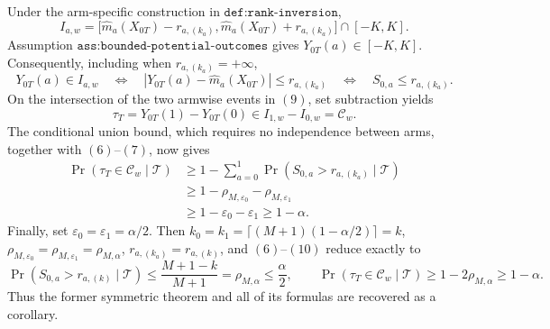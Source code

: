 Under the arm-specific construction in \(\texttt{def:rank-inversion}\),
\[
I_{a,w}=\bigl[\widehat m_a(X_{0T})-r_{a,(k_a)},\widehat m_a(X_{0T})+r_{a,(k_a)}\bigr]\cap[-K,K].
\tag{8}
\]
Assumption \(\texttt{ass:bounded-potential-outcomes}\) gives \(Y_{0T}(a)\in[-K,K]\). Consequently, including when \(r_{a,(k_a)}=+\infty\),
\[
Y_{0T}(a)\in I_{a,w}\quad\Longleftrightarrow\quad |Y_{0T}(a)-\widehat m_a(X_{0T})|\le r_{a,(k_a)}\quad\Longleftrightarrow\quad S_{0,a}\le r_{a,(k_a)}.
\tag{9}
\]
On the intersection of the two armwise events in \((9)\), set subtraction yields
\[
\tau_T=Y_{0T}(1)-Y_{0T}(0)\in I_{1,w}-I_{0,w}=\mathcal C_w.
\]
The conditional union bound, which requires no independence between arms, together with \((6)\)--\((7)\), now gives
\[
\begin{aligned}
\Pr(\tau_T\in\mathcal C_w\mid\mathcal T)
&\ge1-\sum_{a=0}^1\Pr(S_{0,a}>r_{a,(k_a)}\mid\mathcal T)\\
&\ge1-\rho_{M,\varepsilon_0}-\rho_{M,\varepsilon_1}\\
&\ge1-\varepsilon_0-\varepsilon_1\ge1-\alpha.
\end{aligned}
\tag{10}
\]
Finally, set \(\varepsilon_0=\varepsilon_1=\alpha/2\). Then \(k_0=k_1=\lceil(M+1)(1-\alpha/2)\rceil=k\), \(\rho_{M,\varepsilon_0}=\rho_{M,\varepsilon_1}=\rho_{M,\alpha}\), \(r_{a,(k_a)}=r_{a,(k)}\), and \((6)\)--\((10)\) reduce exactly to
\[
\Pr(S_{0,a}>r_{a,(k)}\mid\mathcal T)\le\frac{M+1-k}{M+1}=\rho_{M,\alpha}\le\frac{\alpha}{2},\qquad \Pr(\tau_T\in\mathcal C_w\mid\mathcal T)\ge1-2\rho_{M,\alpha}\ge1-\alpha.
\]
Thus the former symmetric theorem and all of its formulas are recovered as a corollary.